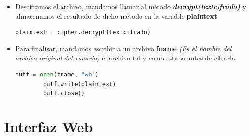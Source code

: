 \begin{itemize}
		\item Desciframos el archivo, mandamos llamar al método \textbf{\textit{decrypt(textcifrado)}}  y almacenamos el resultado de dicho método en la variable \textbf{plaintext}
		
\begin{lstlisting}[language=Python,frame=single, keywordstyle=\color{blue}]
	plaintext = cipher.decrypt(textcifrado)
\end{lstlisting}

		\item Para finalizar, mandamos escribir a un archivo \textbf{fname} \textit{(Es el nombre del archivo original del usuario)} el archivo tal y como estaba antes de cifrarlo. 
			
\begin{lstlisting}[language=Python,frame=single, keywordstyle=\color{blue}]
		outf = open(fname, "wb")
		outf.write(plaintext)
		outf.close()
\end{lstlisting}

\end{itemize}

\section{Interfaz Web}

